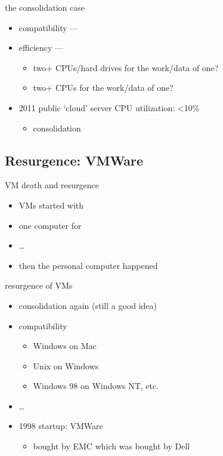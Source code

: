 \begin{frame}{the consolidation case}
\begin{itemize}
    \item compatibility --- 
    \item efficiency --- 
        \begin{itemize}
        \item two+ CPUs/hard drives for the work/data of one?
        \item two+ CPUs for the work/data of one?
        \end{itemize}
    \vspace{.5cm}
    \item 2011 public `cloud' server CPU utilization: <10\%
        \begin{itemize}
        \item {} consolidation
        \end{itemize}
\end{itemize}
\end{frame}

\subsection{Resurgence: VMWare}

\begin{frame}{VM death and resurgence}
\begin{itemize}
\item VMs started with 
\item one computer for 
\item \ldots{}
\item then the personal computer happened
\end{itemize}
\end{frame}

\begin{frame}{resurgence of VMs}
\begin{itemize}
    \item consolidation again (still a good idea)
    \item compatibility 
        \begin{itemize} 
        \item Windows on Mac
        \item Unix on Windows
        \item Windows 98 on Windows NT, etc.
        \end{itemize}
    \item \ldots
    \item 1998 startup: VMWare 
        \begin{itemize} 
        \item bought by EMC which was bought by Dell
        \end{itemize}
\end{itemize}
\end{frame}

